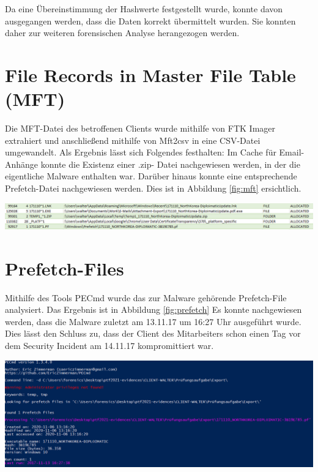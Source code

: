 Da eine Übereinstimmung der Hashwerte festgestellt wurde, konnte davon ausgegangen werden, dass die Daten korrekt übermittelt wurden. Sie konnten daher zur weiteren forensischen Analyse herangezogen werden.

\section{File Records in Master File Table (MFT)}
Die MFT-Datei des betroffenen Clients wurde mithilfe von FTK Imager extrahiert und anschließend mithilfe von Mft2csv in eine CSV-Datei umgewandelt. 
Als Ergebnis lässt sich Folgendes festhalten: Im Cache für Email-Anhänge konnte die Existenz einer .zip- Datei  nachgewiesen werden, in der die eigentliche Malware enthalten war.  Darüber hinaus konnte eine entsprechende Prefetch-Datei  nachgewiesen werden. Dies ist in Abbildung \ref{fig:mft} ersichtlich.

\begin{center}
	\includegraphics[width=15.8cm]{figures/mft.png}
	\label{fig:mft}
\end{center}

\section{Prefetch-Files}
Mithilfe des Tools PECmd wurde das zur Malware gehörende Prefetch-File  analysiert. Das Ergebnis ist in Abbildung \ref{fig:prefetch}
Es konnte nachgewiesen werden, dass die Malware zuletzt am 13.11.17 um 16:27 Uhr ausgeführt wurde. Dies lässt den Schluss zu, dass der Client des Mitarbeiters schon einen Tag vor dem Security Incident am 14.11.17 kompromittiert war.

\begin{center}
	\includegraphics[width=15.8cm]{figures/prefetch.png}
	\label{fig:prefetch}
\end{center}


